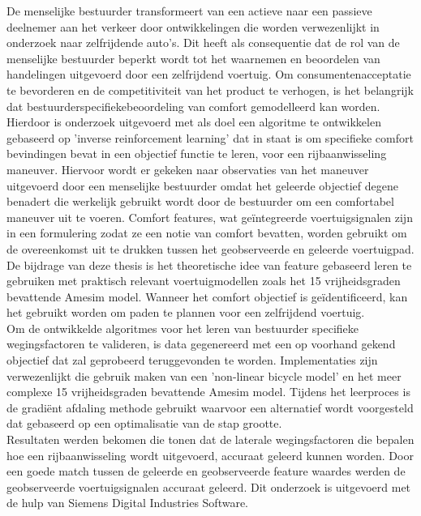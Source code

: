 \documentclass[master=elt,masteroption=eg,english]{kulemt}
\begin{document}
\begin{abstract*}
De menselijke bestuurder transformeert van een actieve naar een passieve deelnemer aan het verkeer door ontwikkelingen die worden verwezenlijkt in onderzoek naar zelfrijdende auto's.  Dit heeft als consequentie dat de rol van de menselijke bestuurder beperkt wordt tot het waarnemen en beoordelen van handelingen uitgevoerd door een zelfrijdend voertuig.  Om consumentenacceptatie te bevorderen en de competitiviteit van het product te verhogen, is het belangrijk dat bestuurderspecifiekebeoordeling van comfort gemodelleerd kan worden.\\

Hierdoor is onderzoek uitgevoerd met als doel een algoritme te ontwikkelen gebaseerd op 'inverse reinforcement learning' dat in staat is om specifieke comfort bevindingen bevat in een objectief functie te leren, voor een rijbaanwisseling maneuver. Hiervoor wordt er gekeken naar observaties van het maneuver uitgevoerd door een menselijke bestuurder omdat het geleerde objectief degene benadert die werkelijk gebruikt wordt door de bestuurder om een comfortabel maneuver uit te voeren.
Comfort features, wat ge{\"i}ntegreerde voertuigsignalen zijn in een formulering zodat ze een notie van comfort bevatten, worden gebruikt om de overeenkomst uit te drukken tussen het geobserveerde en geleerde voertuigpad. De bijdrage van deze thesis is het theoretische idee van feature gebaseerd leren te gebruiken met praktisch relevant voertuigmodellen zoals het 15 vrijheidsgraden bevattende Amesim model. Wanneer het comfort objectief is ge{\"i}dentificeerd, kan het gebruikt worden om paden te plannen voor een zelfrijdend voertuig.\\

Om de ontwikkelde algoritmes voor het leren van bestuurder specifieke wegingsfactoren te valideren, is data gegenereerd met een op voorhand gekend objectief dat zal geprobeerd teruggevonden te worden. Implementaties zijn verwezenlijkt die gebruik maken van een 'non-linear bicycle model' en het meer complexe 15 vrijheidsgraden bevattende Amesim model. Tijdens het leerproces is de gradi{\"e}nt afdaling methode gebruikt waarvoor een alternatief wordt voorgesteld dat gebaseerd op een optimalisatie van de stap grootte.\\ 

Resultaten werden bekomen die tonen dat de laterale wegingsfactoren die bepalen hoe een rijbaanwisseling wordt uitgevoerd, accuraat geleerd kunnen worden. Door een goede match tussen de geleerde en geobserveerde feature waardes werden de geobserveerde voertuigsignalen accuraat geleerd. Dit onderzoek is uitgevoerd met de hulp van Siemens Digital Industries Software.  


  

\end{abstract*}
\end{document}

